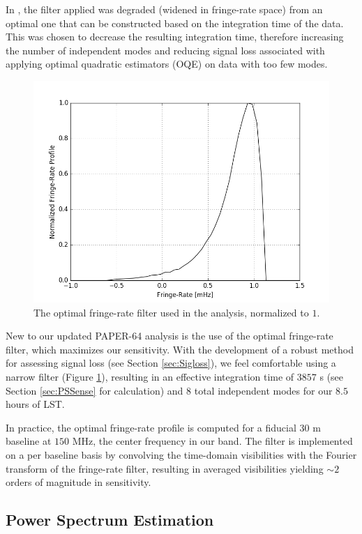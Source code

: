 \documentclass[preprint2,numberedappendix,tighten,twocolappendix]{aastex6}  %
\begin{document}
In \citet{ali_et_al2015}, the filter applied was degraded (widened in fringe-rate space) from an optimal one that can be constructed based on the integration time of the data. This was chosen to decrease the resulting integration time, therefore increasing the number of independent modes and reducing signal loss associated with applying optimal quadratic estimators (OQE) on data with too few modes.

\begin{figure}
	\centering
	\includegraphics[width=\columnwidth]{frp.png}
	\caption{The optimal fringe-rate filter used in the analysis, normalized to $1$.}
	\label{fig:frp}
\end{figure}

New to our updated PAPER-64 analysis is the use of the optimal fringe-rate filter, which maximizes our sensitivity. With the development of a robust method for assessing signal loss (see Section \ref{sec:Sigloss}), we feel comfortable using a narrow filter (Figure \ref{fig:frp}), resulting in an effective integration time of $3857$ s (see Section \ref{sec:PSSense} for calculation) and $8$ total independent modes for our $8.5$ hours of LST. 

In practice, the optimal fringe-rate profile is computed for a fiducial $30$ m baseline at $150$ MHz, the center frequency in our band. The filter is implemented on a per baseline basis by convolving the time-domain visibilities with the Fourier transform of the fringe-rate filter, resulting in averaged visibilities yielding $\sim 2$ orders of magnitude in sensitivity.

\subsection{Power Spectrum Estimation}
\label{sec:PSEst}
\end{document}
